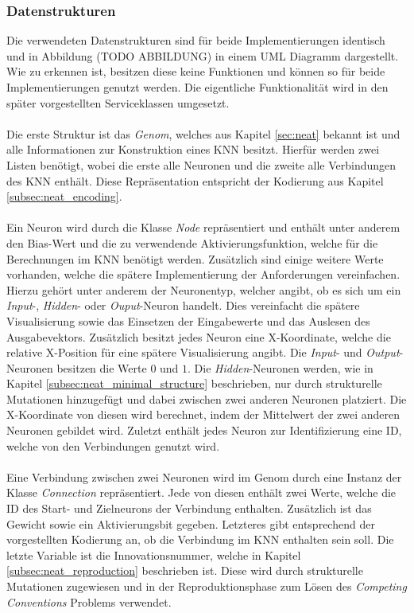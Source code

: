 \subsubsection{Datenstrukturen}
\label{subsubsec:data_structures}
Die verwendeten Datenstrukturen sind für beide Implementierungen identisch und in Abbildung (TODO ABBILDUNG) in einem UML Diagramm dargestellt. Wie zu erkennen ist, besitzen diese keine Funktionen und können so für beide Implementierungen genutzt werden. Die eigentliche Funktionalität wird in den später vorgestellten Serviceklassen umgesetzt.
\\\\
Die erste Struktur ist das \emph{Genom}, welches aus Kapitel \ref{sec:neat} bekannt ist und alle Informationen zur Konstruktion eines \ac{KNN} besitzt. Hierfür werden zwei Listen benötigt, wobei die erste alle Neuronen und die zweite alle Verbindungen des \ac{KNN} enthält. Diese Repräsentation entspricht der Kodierung aus Kapitel \ref{subsec:neat_encoding}. 
\\\\
Ein Neuron wird durch die Klasse \emph{Node} repräsentiert und enthält unter anderem den Bias-Wert und die zu verwendende Aktivierungsfunktion, welche für die Berechnungen im \ac{KNN} benötigt werden. Zusätzlich sind einige weitere Werte vorhanden, welche die spätere Implementierung der Anforderungen vereinfachen. Hierzu gehört unter anderem der Neuronentyp, welcher angibt, ob es sich um ein \emph{Input}-, \emph{Hidden}- oder \emph{Ouput}-Neuron handelt. Dies vereinfacht die spätere Visualisierung sowie das Einsetzen der Eingabewerte und das Auslesen des Ausgabevektors. Zusätzlich besitzt jedes Neuron eine X-Koordinate, welche die relative X-Position für eine spätere Visualisierung angibt. Die \emph{Input}- und \emph{Output}-Neuronen besitzen die Werte $0$ und $1$. Die \emph{Hidden}-Neuronen werden, wie in Kapitel \ref{subsec:neat_minimal_structure} beschrieben, nur durch strukturelle Mutationen hinzugefügt und dabei zwischen zwei anderen Neuronen platziert. Die X-Koordinate von diesen wird berechnet, indem der Mittelwert der zwei anderen Neuronen gebildet wird. Zuletzt enthält jedes Neuron zur Identifizierung eine ID, welche von den Verbindungen genutzt wird.
\\\\
Eine Verbindung zwischen zwei Neuronen wird im Genom durch eine Instanz der Klasse \emph{Connection} repräsentiert. Jede von diesen enthält zwei Werte, welche die ID des Start- und Zielneurons der Verbindung enthalten. Zusätzlich ist das Gewicht sowie ein Aktivierungsbit gegeben. Letzteres gibt entsprechend der vorgestellten Kodierung an, ob die Verbindung im \ac{KNN} enthalten sein soll. Die letzte Variable ist die Innovationsnummer, welche in Kapitel \ref{subsec:neat_reproduction} beschrieben ist. Diese wird durch strukturelle Mutationen zugewiesen und in der Reproduktionsphase zum Lösen des \emph{Competing Conventions} Problems verwendet.
